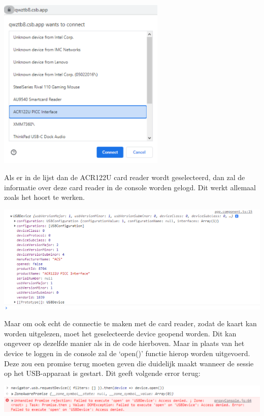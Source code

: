 \begin{center}
    \includegraphics[width=8cm]{device_list}
\end{center}

Als er in de lijst dan de ACR122U card reader wordt geselecteerd, dan zal de informatie over deze card reader in de console worden gelogd. Dit werkt allemaal zoals het hoort te werken.

\begin{center}
    \includegraphics[width=16cm]{device_log}
\end{center}

Maar om ook echt de connectie te maken met de card reader, zodat de kaart kan worden uitgelezen, moet het geselecteerde device geopend worden. Dit kan ongeveer op dezelfde manier als in de code hierboven. Maar in plaats van het device te loggen in de console zal de ‘open()’ functie hierop worden uitgevoerd. Deze zou een promise terug moeten geven die duidelijk maakt wanneer de sessie op het USB-apparaat is gestart. Dit geeft volgende error terug: 

\begin{center}
    \includegraphics[width=16cm]{webusb_error}
\end{center}

